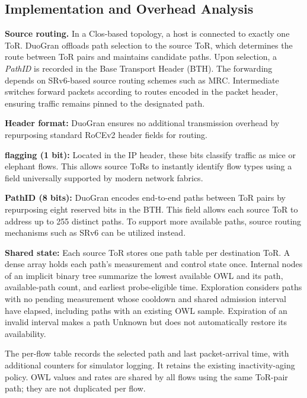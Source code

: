 \documentclass[10pt,journal,compsoc]{IEEEtran}
\begin{document}
\subsection{Implementation and Overhead Analysis}
\label{sec:implementation}
\noindent
\textbf{Source routing.} In a Clos-based topology, a host is connected to exactly one ToR. DuoGran offloads path selection to the source ToR, which determines the route between ToR pairs and maintains candidate paths. Upon selection, a \textit{PathID} is recorded in the Base Transport Header (BTH). The forwarding depends on SRv6-based \cite{srv6} source routing schemes such as MRC. Intermediate switches forward packets according to routes encoded in the packet header, ensuring traffic remains pinned to the designated path.

\noindent
\textbf{Header format:} DuoGran ensures no additional transmission overhead by repurposing standard RoCEv2 header fields for routing.
\begin{enumerate*}[label=(\roman*)]
	\item \textbf{flagging (1 bit):} Located in the IP header, these bits classify traffic as mice or elephant flows. This allows source ToRs to instantly identify flow types using a field universally supported by modern network fabrics.
	\item \textbf{PathID (8 bits):} DuoGran encodes end-to-end paths between ToR pairs by repurposing eight reserved bits in the BTH. This field allows each source ToR to address up to 255 distinct paths. To support more available paths, source routing mechanisms such as SRv6 \cite{srv6} can be utilized instead.
\end{enumerate*}

\noindent
\textbf{Shared state:} Each source ToR stores one path table per destination ToR. A dense array holds each path's measurement and control state once. Internal nodes of an implicit binary tree summarize the lowest available OWL and its path, available-path count, and earliest probe-eligible time. Exploration considers paths with no pending measurement whose cooldown and shared admission interval have elapsed, including paths with an existing OWL sample. Expiration of an invalid interval makes a path Unknown but does not automatically restore its availability.

The per-flow table records the selected path and last packet-arrival time, with additional counters for simulator logging. It retains the existing inactivity-aging policy. OWL values and rates are shared by all flows using the same ToR-pair path; they are not duplicated per flow.
\end{document}
